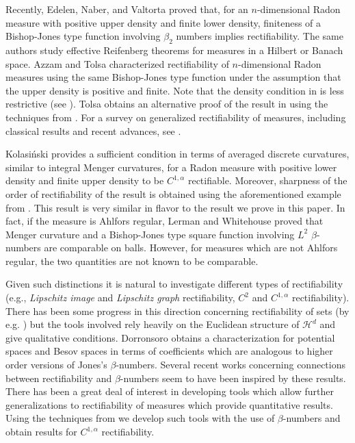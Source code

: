 \documentclass[11pt, twoside, leqno]{article}
\numberwithin{equation}{section}
\theoremstyle{plain}
\theoremstyle{definition}
\begin{document}
Recently, Edelen, Naber, and Valtorta   \cite{naber} proved that, for an $n$-dimensional Radon measure with positive upper density and finite lower density, finiteness of a Bishop-Jones type function involving $\beta_2$ numbers implies rectifiability. The same authors \cite{naber2} study effective Reifenberg theorems for measures in a Hilbert or Banach space.
Azzam and Tolsa \cite{tolsaI, ATII} characterized rectifiability of $n$-dimensional Radon measures using the same Bishop-Jones type function under the assumption that the upper density is positive and finite. Note that the density condition in \cite{naber} is less restrictive (see \cite{tolsaarxiv}). Tolsa \cite{tolsaarxiv} obtains an alternative proof of the result in \cite{naber} using the techniques from \cite{tolsaI, ATII}. For a survey on generalized rectifiability of measures, including classical results and recent advances, see \cite{survey}.


Kolasi\'{n}ski \cite{kola3} provides a sufficient condition in terms of averaged discrete curvatures, similar to integral Menger curvatures, for a Radon measure with positive lower density and finite upper density to be $C^{1,\alpha}$ rectifiable. Moreover, sharpness of the order of rectifiability of the result is obtained using the aforementioned example from \cite{anzellottiserapioni}. This result is very similar in flavor to the result we prove in this paper. In fact, if the measure is Ahlfors regular, Lerman and Whitehouse \cite{lerman1, lerman2} proved that Menger curvature and a Bishop-Jones type square function involving $L^2$ $\beta$-numbers are comparable on balls. However, for measures which are not Ahlfors regular, the two quantities are not known to be comparable.

Given such distinctions it is natural to investigate different types of rectifiability (e.g., \emph{Lipschitz image} and \emph{Lipschitz graph} rectifiability, $C^2$ and $C^{1,\alpha}$ rectifiability). There has been some progress in this direction concerning rectifiability of sets (by e.g.   \cite{anzellottiserapioni}) but the tools involved rely heavily on the Euclidean structure of $\mathcal{H}^d$ and give qualitative conditions. Dorronsoro \cite{dorronsoro1,dorronsoro2} obtains a characterization for potential spaces and Besov spaces in terms of coefficients which are analogous to higher order versions of Jones's $\beta$-numbers. Several recent works concerning connections between rectifiability and $\beta$-numbers seem to have been inspired by these results.
 There has been a great deal of interest in developing tools which allow further generalizations to rectifiability of measures which provide quantitative results. Using the techniques from   \cite{davidtoro} we develop such tools with the use of $\beta$-numbers and obtain results for $C^{1,\alpha}$ rectifiability. 
\end{document}
